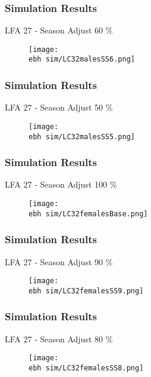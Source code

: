 \documentclass{beamer}
\newcommand{\ebh}{\string~/bio.data/bio.lobster/figures/LFA2733Framework2018/} %
\begin{document}
\begin{frame}
\frametitle{Simulation Results}
LFA 27 - Season Adjust 60 \%
\begin{figure}
        \begin{center}
            \texttt{[image: \\ebh sim/LC32malesSS6.png]}
        \end{center}
    \end{figure}
\end{frame}


\begin{frame}
\frametitle{Simulation Results}
LFA 27 - Season Adjust 50 \%
\begin{figure}
        \begin{center}
            \texttt{[image: \\ebh sim/LC32malesSS5.png]}
        \end{center}
    \end{figure}
\end{frame}




\begin{frame}
\frametitle{Simulation Results}
LFA 27 - Season Adjust 100 \%
\begin{figure}
        \begin{center}
            \texttt{[image: \\ebh sim/LC32femalesBase.png]}
        \end{center}
    \end{figure}
\end{frame}


\begin{frame}
\frametitle{Simulation Results}
LFA 27 - Season Adjust 90 \%
\begin{figure}
        \begin{center}
            \texttt{[image: \\ebh sim/LC32femalesSS9.png]}
        \end{center}
    \end{figure}
\end{frame}


\begin{frame}
\frametitle{Simulation Results}
LFA 27 - Season Adjust 80 \%
\begin{figure}
        \begin{center}
            \texttt{[image: \\ebh sim/LC32femalesSS8.png]}
        \end{center}
    \end{figure}
\end{frame}
\end{document}
